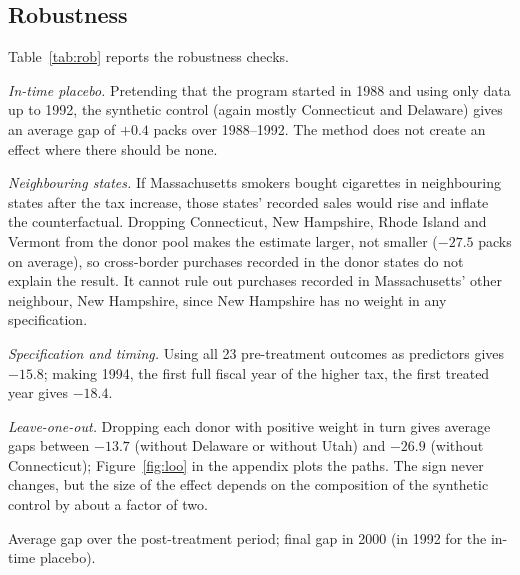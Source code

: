 \documentclass[11pt]{article}
\begin{document}
\begin{table}[H]\centering\small
\caption{DiD effects on log sales and log price, and the implied elasticity.}\label{tab:elas}

\end{table}

\subsection{Robustness}
Table~\ref{tab:rob} reports the robustness checks.

\emph{In-time placebo.} Pretending that the program started in 1988 and using
only data up to 1992, the synthetic control (again mostly Connecticut and
Delaware) gives an average gap of $+0.4$ packs over 1988--1992. The method does
not create an effect where there should be none.

\emph{Neighbouring states.} If Massachusetts smokers bought cigarettes in
neighbouring states after the tax increase, those states' recorded sales would
rise and inflate the counterfactual. Dropping Connecticut, New Hampshire, Rhode
Island and Vermont from the donor pool makes the estimate larger, not smaller
($-27.5$ packs on average), so cross-border purchases recorded in the donor
states do not explain the result. It cannot rule out purchases recorded in
Massachusetts' other neighbour, New Hampshire, since New Hampshire has no
weight in any specification.

\emph{Specification and timing.} Using all 23 pre-treatment outcomes as
predictors gives $-15.8$; making 1994, the first full fiscal year of the higher
tax, the first treated year gives $-18.4$.

\emph{Leave-one-out.} Dropping each donor with positive weight in turn gives
average gaps between $-13.7$ (without Delaware or without Utah) and $-26.9$
(without Connecticut); Figure~\ref{fig:loo} in the appendix plots the paths.
The sign never changes, but the size of the effect depends on the composition
of the synthetic control by about a factor of two.

\begin{table}[H]\centering\scriptsize
\caption{Robustness of the Massachusetts synthetic control estimate (packs per capita).}\label{tab:rob}
\resizebox{\textwidth}{!}{}
\par\smallskip\footnotesize Average gap over the post-treatment period; final
gap in 2000 (in 1992 for the in-time placebo).
\end{table}
\end{document}
